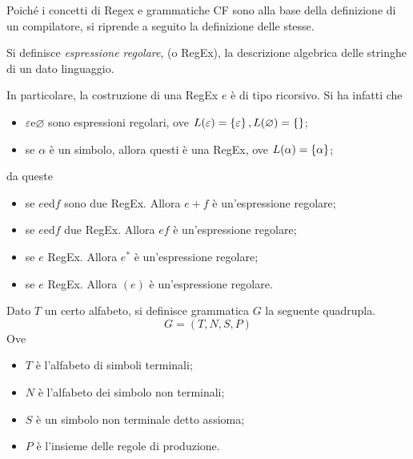 \documentclass{subfiles}
\begin{document}
Poiché i concetti di Regex e grammatiche CF sono alla base della definizione di un compilatore,
si riprende a seguito la definizione delle stesse.
\begin{Definition*}
    Si definisce \emph{espressione regolare}, (o RegEx), la descrizione algebrica delle stringhe di un dato linguaggio.
\end{Definition*}
\noindent In particolare, la costruzione di una RegEx $e$ è di tipo ricorsivo. Si ha infatti che
\begin{itemize}
    \item $\varepsilon \text{e} \varnothing$ sono espressioni regolari, ove $L(\varepsilon) = \Set{\varepsilon}, L(\varnothing) = \Set{}$;
    \item se $\alpha$ è un simbolo, allora questi è una RegEx, ove $L(\alpha) = \Set{\alpha}$;
\end{itemize}
da queste
\begin{itemize}
    \item se $e \text{ed} f$ sono due RegEx. Allora $e + f$ è un'espressione regolare;
    \item se $e \text{ed} f$ due RegEx. Allora $ef$ è un'espressione regolare;
    \item se $e$ RegEx. Allora $e^{*}$ è un'espressione regolare;
    \item se $e$ RegEx. Allora $(e)$ è un'espressione regolare.
\end{itemize}

\begin{Definition*}
    Dato $T$ un certo alfabeto, si definisce grammatica $G$ la seguente quadrupla.
    \[
        G = (T, N, S, P)
    \]
    Ove
    \begin{itemize}
        \item $T$ è l'alfabeto di simboli terminali;
        \item $N$ è l'alfabeto dei simbolo non terminali;
        \item $S$ è un simbolo non terminale detto assioma;
        \item $P$ è l'insieme delle regole di produzione.
    \end{itemize}
\end{Definition*}
\end{document}

